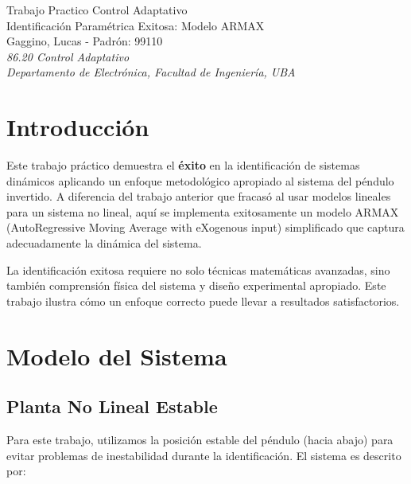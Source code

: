 \documentclass[a4paper,openright,9pt]{report}
\begin{document}
\vspace{\fill}

\begin{center}

\Huge{Trabajo Practico Control Adaptativo}
\\
\Huge{Identificación Paramétrica Exitosa: Modelo ARMAX}
\bigskip \\
\small{Gaggino, Lucas - Padrón: 99110}
\\

\small{\textit{86.20 Control Adaptativo }}
\\
\small{\textit{Departamento de Electrónica, Facultad de Ingeniería, UBA}}\\
\indent

\end{center}
\vspace{\fill}
\newpage

\section{Introducción}

Este trabajo práctico demuestra el \textbf{éxito} en la identificación de sistemas dinámicos aplicando un enfoque metodológico apropiado al sistema del péndulo invertido. A diferencia del trabajo anterior que fracasó al usar modelos lineales para un sistema no lineal, aquí se implementa exitosamente un modelo ARMAX (AutoRegressive Moving Average with eXogenous input) simplificado que captura adecuadamente la dinámica del sistema.

La identificación exitosa requiere no solo técnicas matemáticas avanzadas, sino también comprensión física del sistema y diseño experimental apropiado. Este trabajo ilustra cómo un enfoque correcto puede llevar a resultados satisfactorios.

\section{Modelo del Sistema}

\subsection{Planta No Lineal Estable}

Para este trabajo, utilizamos la posición estable del péndulo (hacia abajo) para evitar problemas de inestabilidad durante la identificación. El sistema es descrito por:
\end{document}
